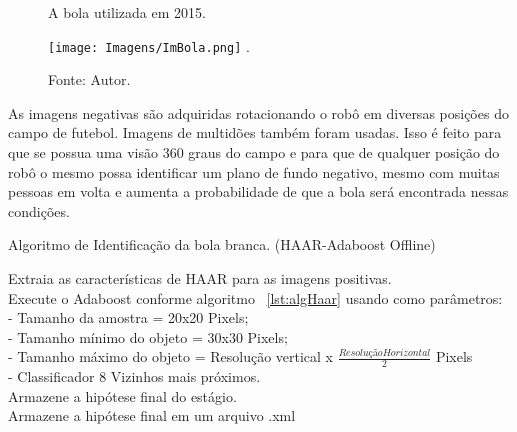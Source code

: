 \begin{figure}[!h!]
\centering \caption{A bola utilizada em 2015.}
\texttt{[image: Imagens/ImBola.png]}
\DeclareGraphicsExtensions.
\caption*{Fonte: Autor.}
\label{Fig:BolaBranca}
\end{figure}

As imagens negativas são adquiridas rotacionando o robô em diversas posições do \\campo de futebol. Imagens de multidões também foram usadas. Isso é feito para que se possua uma visão 360 graus do campo e para que de qualquer posição do robô o mesmo possa identificar um plano de fundo negativo, mesmo com muitas pessoas em volta e aumenta a probabilidade de que a bola será encontrada nessas condições. 

\begin{algorithm}

\caption{Algoritmo de Identificação da bola branca. (HAAR-Adaboost Offline)}\label{lst:algHaarOFBall}



{
	{
	Extraia as características de HAAR para as imagens positivas.\\
	Execute o Adaboost conforme algoritmo ~\ref{lst:algHaar} usando como parâmetros:\\
		- Tamanho da amostra = 20x20 Pixels;\\
		- Tamanho mínimo do objeto = 30x30 Pixels;\\
		- Tamanho máximo do objeto = Resolução vertical x \( \frac {Resolução Horizontal}{2}\) Pixels\\
		- Classificador 8 Vizinhos mais próximos. \\
	}
	Armazene a hipótese final do estágio.\\
}
	Armazene a hipótese final em um arquivo .xml




\end{algorithm}

